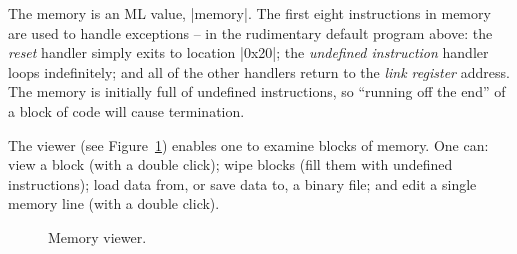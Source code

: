 \documentclass[12pt]{article}
\newcommand{\F}{Figure~}
\begin{document}
The memory is an ML value, |memory|.  The first eight instructions in memory are used to handle exceptions -- in the rudimentary default program above: the \emph{reset} handler simply exits to location |0x20|; the \emph{undefined instruction} handler loops indefinitely; and all of the other handlers return to the \emph{link register} address. The memory is initially full of undefined instructions, so ``running off the end'' of a block of code will cause termination.

The viewer (see \F\ref{mem:fig}) enables one to examine blocks of memory.  One can: view a block (with a double click); wipe blocks (fill them with undefined instructions); load data from, or save data to, a binary file; and edit a single memory line (with a double click).
\begin{figure}
\begin{center}
\caption{Memory viewer.}
\label{mem:fig}
\end{center}
\end{figure}
\end{document}
